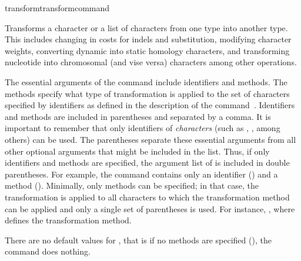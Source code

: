 \begin{command}{transform}{transformcommand}


	\begin{poydescription} 
            Transforms a character or a list of characters from one type into
            another type. This includes changing in costs for indels and substitution,
            modifying character weights, converting dynamic into static homology characters,
            and transforming nucleotide into chromosomal (and vise versa) characters
            among other operations.
            
            The essential arguments of the command
             include identifiers and methods. The methods
            specify what type of transformation is applied to the set of characters
            specified by identifiers as defined in the description of the command~.
            Identifiers and methods are included in parentheses and separated by
            a comma. It is important to remember that only identifiers of
            \emph{characters} (such as , , among
            others) can be used. The parentheses separate these essential
            arguments from all other optional arguments that might be included
            in the list. Thus, if only identifiers and methods are specified,
            the argument list of  is included in double
            parentheses. For example, the command  contains only an identifier () and a
            method ().  Minimally, only methods can be
            specified; in that case, the transformation is applied to all
            characters to which the transformation method can be applied and only a
            single set of parentheses is used. For instance,
            , where
             defines
            the transformation method.

            There are no default values for , that is if
            no methods are specified (), the command does nothing.
	\end{poydescription}

	\begin{arguments}
	

\end{arguments}
\end{command}
